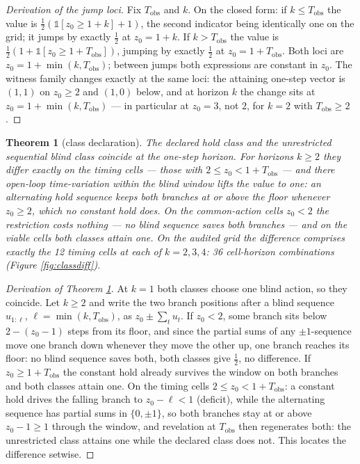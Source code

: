 \documentclass[10pt,twocolumn]{article}
\theoremstyle{plain}
\newtheorem{theorem}{Theorem}
\theoremstyle{definition}
\theoremstyle{remark}
\begin{document}
\begin{proof}[Derivation of the jump loci]
Fix \(T_{\mathrm{obs}}\) and \(k\). On the closed form: if
\(k \le T_{\mathrm{obs}}\) the value is
\(\tfrac{1}{2}(\mathbb{1}[z_{0} \ge 1 + k] + 1)\), the second indicator
being identically one on the grid; it jumps by exactly \(\tfrac{1}{2}\)
at \(z_{0} = 1 + k\). If \(k > T_{\mathrm{obs}}\) the value is
\(\tfrac{1}{2}(1 + \mathbb{1}[z_{0} \ge 1 + T_{\mathrm{obs}}])\),
jumping by exactly \(\tfrac{1}{2}\) at \(z_{0} = 1 + T_{\mathrm{obs}}\).
Both loci are \(z_{0} = 1 + \min(k, T_{\mathrm{obs}})\); between jumps
both expressions are constant in \(z_{0}\). The witness family changes
exactly at the same loci: the attaining one-step vector is \((1, 1)\) on
\(z_{0} \ge 2\) and \((1, 0)\) below, and at horizon \(k\) the change
sits at \(z_{0} = 1 + \min(k, T_{\mathrm{obs}})\) --- in particular at
\(z_{0} = 3\), not \(2\), for \(k = 2\) with \(T_{\mathrm{obs}} \ge 2\).
\end{proof}

\begin{theorem}[class declaration]\label{thm:class}
The declared hold class and the unrestricted sequential blind class
coincide at the one-step horizon. For horizons \(k \ge 2\) they differ
exactly on the timing cells --- those with
\(2 \le z_{0} < 1 + T_{\mathrm{obs}}\) --- and there open-loop
time-variation within the blind window lifts the value to one: an
alternating hold sequence keeps both branches at or above the floor
whenever \(z_{0} \ge 2\), which no constant hold does. On the
common-action cells \(z_{0} < 2\) the restriction costs nothing --- no
blind sequence saves both branches --- and on the viable cells both
classes attain one. On the audited grid the difference comprises exactly
the 12 timing cells at each of \(k = 2, 3, 4\): 36 cell-horizon
combinations (Figure \ref{fig:classdiff}).
\end{theorem}

\begin{proof}[Derivation of Theorem \ref{thm:class}]
At \(k = 1\) both classes choose one blind action, so they coincide. Let
\(k \ge 2\) and write the two branch positions after a blind sequence
\(u_{1:\ell}\), \(\ell = \min(k, T_{\mathrm{obs}})\), as
\(z_{0} \pm \sum_{t} u_{t}\). If \(z_{0} < 2\), some branch sits below
\(2 - (z_{0} - 1)\) steps from its floor, and since the partial sums of
any \(\pm1\)-sequence move one branch down whenever they move the other
up, one branch reaches its floor: no blind sequence saves both, both
classes give \(\tfrac{1}{2}\), no difference. If
\(z_{0} \ge 1 + T_{\mathrm{obs}}\) the constant hold already survives
the window on both branches and both classes attain one. On the timing
cells \(2 \le z_{0} < 1 + T_{\mathrm{obs}}\): a constant hold drives the
falling branch to \(z_{0} - \ell < 1\) (deficit), while the alternating
sequence has partial sums in \(\{0, \pm 1\}\), so both branches stay at
or above \(z_{0} - 1 \ge 1\) through the window, and revelation at
\(T_{\mathrm{obs}}\) then regenerates both: the unrestricted class
attains one while the declared class does not. This locates the
difference setwise.
\end{proof}
\end{document}

